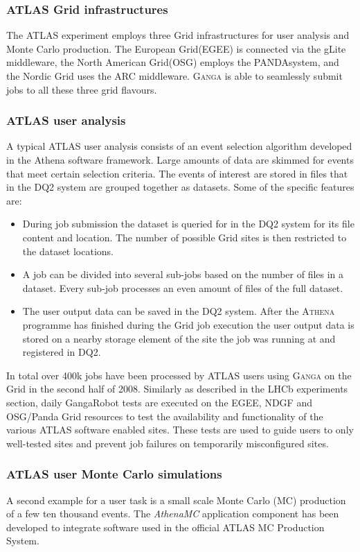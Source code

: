 \documentclass{elsart}
\def\atlas {ATLAS\xspace}
\def\ganga {\textsc{Ganga}\xspace}
\def\athena {\textsc{Athena}\xspace}
\def\grid {Grid\xspace}
\def\panda{PANDA}
\begin{document}
\subsubsection{\atlas \grid infrastructures}

The \atlas experiment employs three \grid infrastructures for user
analysis and Monte Carlo production. The European \grid (EGEE) is
connected via the gLite middleware, the North American \grid (OSG)
employs the \panda system, and the Nordic \grid uses the ARC
middleware. \ganga is able to seamlessly submit jobs to all these three
grid flavours.

\subsubsection{\atlas user analysis}
A typical \atlas user analysis consists of an event selection algorithm
developed in the Athena software framework. Large amounts of data are skimmed
for events that meet certain selection criteria. The events of interest are
stored in files that in the DQ2 system are grouped together as datasets. Some
of the specific features are:
\begin{itemize}
\item During job submission the dataset is queried for in the DQ2 system for
  its file content and location.  The number of possible \grid sites is then
  restricted to the dataset locations.
\item A job can be divided into several sub-jobs based on the number of files
  in a dataset. Every sub-job processes an even amount of files of the full
  dataset.
\item The user output data can be saved in the DQ2 system. After the \athena
  programme has finished during the \grid job execution the user output data
  is stored on a nearby storage element of the site the job was running at
  and registered in DQ2.
\end{itemize}

In total over 400k jobs have been processed by \atlas users
using \ganga on the Grid in the second half of 2008. Similarly as
described in the LHCb experiments section, daily GangaRobot tests are
executed on the EGEE, NDGF and OSG/Panda \grid resources to test the
availability and functionality of the various \atlas software enabled
sites. These tests are used to guide users to only well-tested sites and
prevent job failures on temporarily misconfigured sites.

\subsubsection{\atlas user Monte Carlo simulations}
A second example for a user task is a small scale Monte Carlo (MC) production
of a few ten thousand events. The \emph{AthenaMC} application component has
been developed to integrate software used in the official \atlas MC Production
System. %
\end{document}
